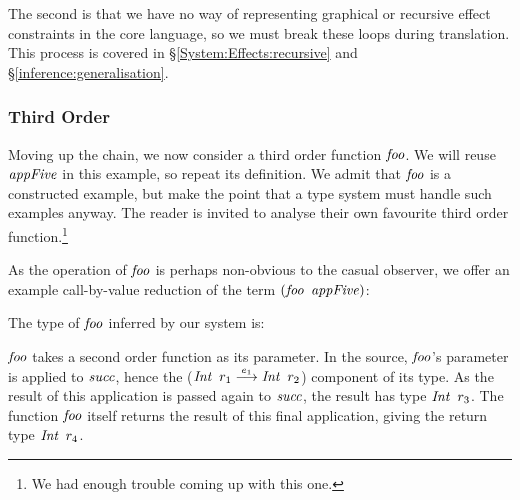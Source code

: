 The second is that we have no way of representing graphical or recursive effect constraints in the core language, so we must break these loops during translation. This process is covered in \S\ref{System:Effects:recursive} and \S\ref{inference:generalisation}.

\subsubsection{Third Order}
Moving up the chain, we now consider a third order function $\operatorname{\mathit{foo}}$. We will reuse $\operatorname{\mathit{appFive}}$ in this example, so repeat its definition. We admit that $\operatorname{\mathit{foo}}$ is a constructed example, but make the point that a type system must handle such examples anyway. The reader is invited to analyse their own favourite third order function.\footnote{We had enough trouble coming up with this one.}

\medskip

As the operation of $\operatorname{\mathit{foo}}$ is perhaps non-obvious to the casual observer, we offer an example call-by-value reduction of the term $(\ifoo \ \iappFive)$:


The type of $\operatorname{\mathit{foo}}$ inferred by our system is:

\medskip

$\operatorname{\mathit{foo}}$ takes a second order function as its parameter. In the source, $\operatorname{\mathit{foo}}$'s parameter is applied to $\operatorname{\mathit{succ}}$, hence the ($\operatorname{\mathit{Int}} \ r_1 \stackrel{e_1}{\longrightarrow} \operatorname{\mathit{Int}} \ r_2$) component of its type. As the result of this application is passed again to $\operatorname{\mathit{succ}}$, the result has type $\operatorname{\mathit{Int}} \ r_3$. The function $\operatorname{\mathit{foo}}$ itself returns the result of this final application, giving the return type $\operatorname{\mathit{Int}} \ r_4$. 

